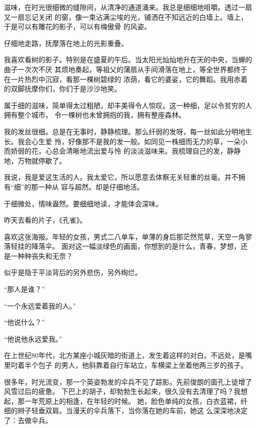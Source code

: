 		滋味，在时光很细微的缝隙间，从清净的通道涌来。我总是细细地咀嚼。透过一扇又一扇忘记关闭
	的窗，像一束沾满尘埃的光，铺洒在不知远近的白墙上。墙上，于是可以有雕花的影子，可以有梅傲骨
	的风姿。

		仔细地走路，抚摩落在地上的光影重叠。

		我喜欢看树的影子。特别是在盛夏的午后。当太阳光灿灿地升在天的中央，当蝉的曲子一次次不厌
	其烦地奏起，等祖父的蒲扇从手间滑落在地上，等全世界都终于在一片热烈中沉寂，看那一棵树碧绿的
	浓荫，看它的婆娑，它的舞蹈。我用赤着的双脚抚摩你们，你们于是沙沙地笑。

		属于细的滋味，简单得太过粗陋，却丰美得令人惊叹。这一种细，足以令贫穷的人拥有整个城市，
	令一棵树也未曾拥抱的我，拥有整座森林。

		我的发丝很细。总是在无事时，静静梳理。那么纤弱的发呀，每一丝如此分明地生长。我会心生爱
	怜，好像那不是我的发一般。如同见一株细而无力的草，一朵小而娇弱的花，心总会清晰地流出爱与怜
	的淡淡滋味来。我梳理自己的发，静静地，万物就停歇了。

		我说，我是爱这生活的人。我太爱它，所以愿意去体察无关轻重的丝毫。并不拥有“细”的那一种从
	容与超然。却是仔细地活。

		于细微处，情味盎然。要细细地读，才能体会深味。

	\endwriting



		昨天去看的片子，《孔雀》。

		喜欢这张海报。年轻的女孩，男式二八单车，单薄的身后那茫然荒草，天空一角寥落轻挂的降落伞。
	面对这一幅淡绿色的画面，你想到的是什么，青春，梦想，还是一种种丧失和无奈？

		似乎是隐于平淡背后的另外悲伤，另外绚烂。

	\endwriting



		“那人是谁？” \par
		“一个永远爱着我的人。” \par
		“他说什么？” \par
		“他说他永远爱我。”

		在上世纪80年代，北方某座小城灰暗的街道上，发生着这样的对白。不远处，是嘴里叼着半个包子
	的男人，他斜靠着自行车站立，车横梁上坐着他两三岁的孩子。

		很多年，时光流变，那一个英姿勃发的伞兵不见了踪影。先前俊朗的面孔上徒增了风雪过后的疲惫。
	下巴上的胡子，却勃勃生长起来，很久没有去清理了吗？我想起，那一年荒原上的相逢，在年轻的时候。
	她，脸色单纯的女孩，白衣蓝裙，纤细的辫子轻垂双肩。当漫天的伞兵落下，当你落在她的车前，她这
	么深深地决定了：去做伞兵。

